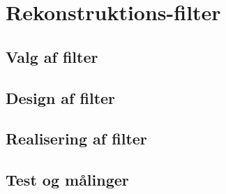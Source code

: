 \section{Rekonstruktions-filter}\label{sec:rek_filter}

\subsection{Valg af filter}

\subsection{Design af filter}

\subsection{Realisering af filter}

\subsection{Test og målinger}